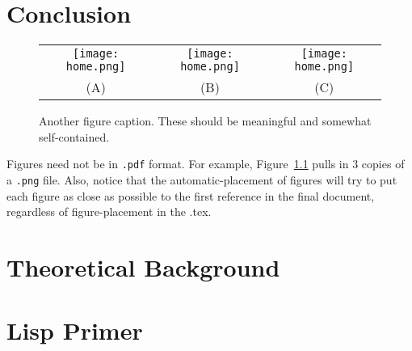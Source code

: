\documentclass{ucl_thesis}
\begin{document}
\chapter{Conclusion}
\label{chp:conc}
%

\begin{figure}
\begin{center}
\begin{tabular}{c|cc}   %
   \texttt{[image: home.png]} &  %
   \texttt{[image: home.png]} &  
   \texttt{[image: home.png]}\\
   (A) & (B) & (C)
\end{tabular}
\caption{Another figure caption. These should be meaningful and somewhat self-contained.} 
  \label{fig:SomeMoreFigs}
\end{center}
\end{figure}

Figures need not be in \texttt{.pdf} format. For example, Figure~\ref{fig:SomeMoreFigs} pulls in $3$ copies of a \texttt{.png} file. Also, notice that the automatic-placement of figures will try to put each figure as close as possible to the first reference in the final document, regardless of figure-placement in the .tex.






\cleardoublepage
\appendix
\chapter{Theoretical Background}
\label{chp:theory}
%

\chapter{Lisp Primer}
\label{cha:lisp-primer}








\end{document}
